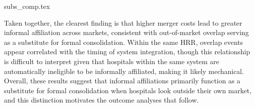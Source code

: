 \documentclass[12pt]{article}
\begin{document}
    {subs_comp.tex}

    Taken together, the clearest finding is that higher merger costs lead to greater informal affiliation across markets, consistent with out-of-market overlap serving as a substitute for formal consolidation. Within the same HRR, overlap events appear correlated with the timing of system integration, though this relationship is difficult to interpret given that hospitals within the same system are automatically ineligible to be informally affiliated, making it likely mechanical. Overall, these results suggest that informal affiliations primarily function as a substitute for formal consolidation when hospitals look outside their own market, and this distinction motivates the outcome analyses that follow.

    



\end{document}
